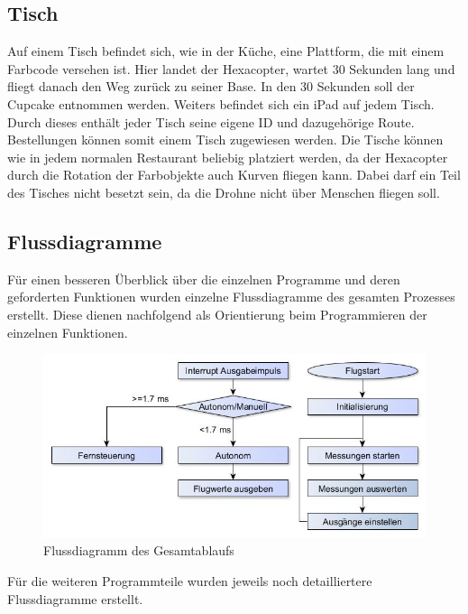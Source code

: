   \subsection*{Tisch}
  Auf einem Tisch befindet sich, wie in der Küche, eine Plattform, die mit einem Farbcode versehen ist. Hier landet der Hexacopter, wartet 30 Sekunden lang und fliegt danach den Weg zurück zu seiner Base. In den 30 Sekunden soll der Cupcake entnommen werden. Weiters befindet sich ein iPad auf jedem Tisch. Durch dieses enthält jeder Tisch seine eigene ID und dazugehörige Route. Bestellungen können somit einem Tisch zugewiesen werden.
  Die Tische können wie in jedem normalen Restaurant beliebig platziert werden, da der Hexacopter durch die Rotation der Farbobjekte auch Kurven fliegen kann. Dabei darf ein Teil des Tisches nicht besetzt sein, da die Drohne nicht über Menschen fliegen soll.


  \subsection{Flussdiagramme}
  Für einen besseren Überblick über die einzelnen Programme und deren geforderten Funktionen wurden einzelne Flussdiagramme des gesamten Prozesses erstellt.
  Diese dienen nachfolgend als Orientierung beim Programmieren der einzelnen Funktionen.

  \begin{figure}[tbh]
    \begin{centering}
      \includegraphics[width = \textwidth]{Bilder/Flussdiagramm}
    \par\end{centering}
    \caption{Flussdiagramm des Gesamtablaufs}
    \label{Flussdiragramm}
  \end{figure}

  Für die weiteren Programmteile wurden jeweils noch detailliertere Flussdiagramme erstellt.

